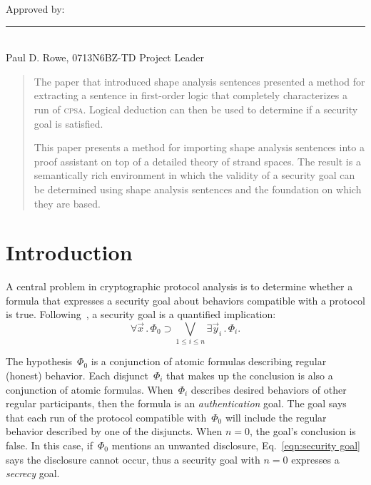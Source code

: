 \documentclass[titlepage,12pt]{article}
\newcommand{\cpsa}{\textsc{cpsa}}
\newcommand{\all}[1]{\forall#1\mathpunct.}
\newcommand{\some}[1]{\exists#1\mathpunct.}
\begin{document}
\noindent
Approved by:\\[1in]
\rule{3in}{.3mm}\\
Paul D. Rowe, 0713N6BZ-TD Project Leader

\clearpage

\else
\maketitle
\fi

\begin{abstract}
The paper that introduced shape analysis sentences presented a method
for extracting a sentence in first-order logic that completely
characterizes a run of {\cpsa}.  Logical deduction can then be used to
determine if a security goal is satisfied.

This paper presents a method for importing shape analysis sentences
into a proof assistant on top of a detailed theory of strand spaces.
The result is a semantically rich environment in which the validity of
a security goal can be determined using shape analysis sentences and the
foundation on which they are based.
\end{abstract}

\tableofcontents
\listoffigures

\clearpage

\section{Introduction}

A central problem in cryptographic protocol analysis is to determine
whether a formula that expresses a security goal about behaviors
compatible with a protocol is true.  Following~\cite{Guttman09}, a
security goal is a quantified implication:
\begin{equation}\label{eqn:security goal}
\all{\vec{x}}\Phi_0\supset\bigvee_{1\le i\le n}\some{\vec{y}_i}\Phi_i.
\end{equation}

The hypothesis~$\Phi_0$ is a conjunction of atomic formulas describing
regular (honest) behavior.  Each disjunct~$\Phi_i$ that makes up the
conclusion is also a conjunction of atomic formulas.  When~$\Phi_i$
describes desired behaviors of other regular participants, then the
formula is an \emph{authentication} goal.
The goal says that each run of the protocol compatible with~$\Phi_0$
will include the regular behavior described by one of the disjuncts.
When $n=0$, the goal's conclusion is false.  In this case, if~$\Phi_0$
mentions an unwanted disclosure, Eq.~\ref{eqn:security goal} says the
disclosure cannot occur, thus a security goal with $n=0$ expresses a
\emph{secrecy} goal.
\end{document}
